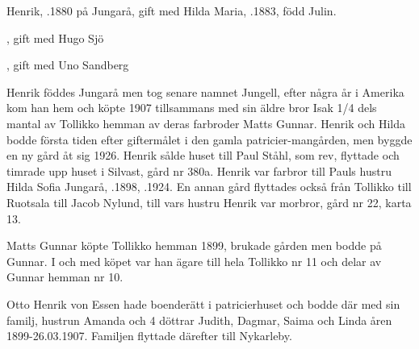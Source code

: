 %
Henrik, .1880 på Jungarå, gift med Hilda Maria, .1883, född Julin.
\begin{jhchildren}
  \item {}
  \item {}, gift med Hugo Sjö
  \item {}
  \item {}
  \item {}
  \item {}, gift med Uno Sandberg
\end{jhchildren}
Henrik föddes Jungarå men tog senare namnet Jungell, efter några år i Amerika kom han hem och köpte 1907 tillsammans med sin äldre bror Isak 1/4 dels mantal av Tollikko hemman av deras farbroder Matts Gunnar. Henrik och Hilda bodde första tiden efter giftermålet i den gamla patricier-mangården, men byggde en ny gård åt sig 1926. Henrik sålde huset till Paul Ståhl, som rev, flyttade och timrade upp huset i Silvast, gård nr 380a. Henrik var farbror till Pauls hustru Hilda Sofia Jungarå, .1898, .1924. En annan gård flyttades också från Tollikko till Ruotsala till Jacob Nylund, till vars hustru Henrik var morbror, gård nr 22, karta 13.


%


%
Matts Gunnar köpte Tollikko hemman 1899, brukade gården men bodde på Gunnar. I och med köpet var han ägare till hela Tollikko nr 11 och delar av Gunnar hemman nr 10.


%
Otto Henrik von Essen hade boenderätt i patricierhuset och bodde där med sin familj, hustrun Amanda och 4 döttrar Judith, Dagmar, Saima och Linda åren 1899-26.03.1907. Familjen flyttade därefter till Nykarleby.

